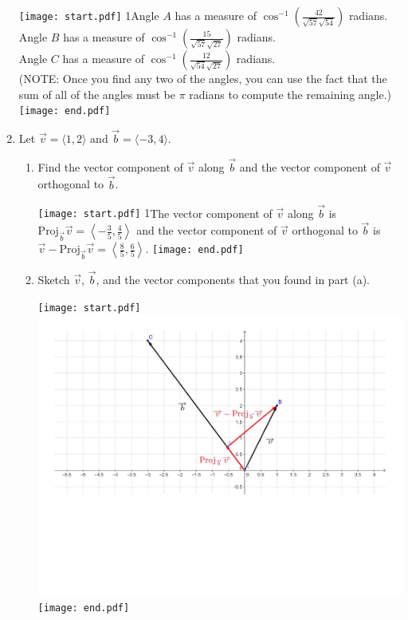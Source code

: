 \documentclass[12pt]{article}
\begin{document}
\begin{enumerate}
\newpage

\texttt{[image: start.pdf]}
{{{1\linewidth}{Angle $A$ has a measure of $\cos^{-1}\left(\frac{42}{\sqrt{57}\sqrt{54}}\right)$ radians.\\
Angle $B$ has a measure of $\cos^{-1}\left(\frac{15}{\sqrt{57}\sqrt{27}}\right)$ radians.\\
Angle $C$ has a measure of $\cos^{-1}\left(\frac{12}{\sqrt{54}\sqrt{27}}\right)$ radians.\\
(NOTE: Once you find any two of the angles, you can use the fact that the sum of all of the angles must be $\pi$ radians to compute the remaining angle.)
}}}
\texttt{[image: end.pdf]}
 

\item  Let $\overrightarrow{v}=\langle 1,2 \rangle$ and $\overrightarrow{b}=\langle -3,4 \rangle$.

\begin{enumerate}

\item Find the vector component of $\overrightarrow{v}$ along $\overrightarrow{b}$ and the vector component of $\overrightarrow{v}$ orthogonal to $\overrightarrow{b}$.  

\texttt{[image: start.pdf]}
{{{1\linewidth}{The vector component of $\overrightarrow{v}$ along $\overrightarrow{b}$ is $\text{Proj}_{\overrightarrow{b}}\overrightarrow{v}=\left\langle -\frac{3}{5},\frac{4}{5}\right\rangle$ and the vector component of $\overrightarrow{v}$ orthogonal to $\overrightarrow{b}$ is $\overrightarrow{v}-\text{Proj}_{\overrightarrow{b}}\overrightarrow{v}=\left\langle\frac{8}{5},\frac{6}{5}\right\rangle$.}}}
\texttt{[image: end.pdf]}


\item Sketch $\overrightarrow{v}$, $\overrightarrow{b}$, and the vector components that you found in part (a).

\texttt{[image: start.pdf]}
{{\includegraphics[scale=0.4]{projection.pdf}}}
\texttt{[image: end.pdf]}



\end{enumerate}
\end{enumerate}
\end{document}
